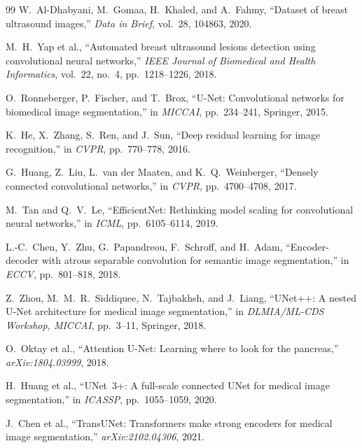\documentclass[11pt]{article}
\begin{document}
\begin{thebibliography}{99}
W.~Al-Dhabyani, M.~Gomaa, H.~Khaled, and A.~Fahmy,
``Dataset of breast ultrasound images,''
\emph{Data in Brief}, vol.~28, 104863, 2020.

M.~H.~Yap et al.,
``Automated breast ultrasound lesions detection using convolutional neural networks,''
\emph{IEEE Journal of Biomedical and Health Informatics}, vol.~22, no.~4, pp.~1218--1226, 2018.

O.~Ronneberger, P.~Fischer, and T.~Brox,
``U-Net: Convolutional networks for biomedical image segmentation,''
in \emph{MICCAI}, pp.~234--241, Springer, 2015.

K.~He, X.~Zhang, S.~Ren, and J.~Sun,
``Deep residual learning for image recognition,''
in \emph{CVPR}, pp.~770--778, 2016.

G.~Huang, Z.~Liu, L.~van der Maaten, and K.~Q.~Weinberger,
``Densely connected convolutional networks,''
in \emph{CVPR}, pp.~4700--4708, 2017.

M.~Tan and Q.~V.~Le,
``EfficientNet: Rethinking model scaling for convolutional neural networks,''
in \emph{ICML}, pp.~6105--6114, 2019.

L.-C.~Chen, Y.~Zhu, G.~Papandreou, F.~Schroff, and H.~Adam,
``Encoder-decoder with atrous separable convolution for semantic image segmentation,''
in \emph{ECCV}, pp.~801--818, 2018.

Z.~Zhou, M.~M.~R.~Siddiquee, N.~Tajbakhsh, and J.~Liang,
``UNet++: A nested U-Net architecture for medical image segmentation,''
in \emph{DLMIA/ML-CDS Workshop, MICCAI}, pp.~3--11, Springer, 2018.

O.~Oktay et al.,
``Attention U-Net: Learning where to look for the pancreas,''
\emph{arXiv:1804.03999}, 2018.

H.~Huang et al.,
``UNet~3+: A full-scale connected UNet for medical image segmentation,''
in \emph{ICASSP}, pp.~1055--1059, 2020.

J.~Chen et al.,
``TransUNet: Transformers make strong encoders for medical image segmentation,''
\emph{arXiv:2102.04306}, 2021.


\end{thebibliography}
\end{document}
